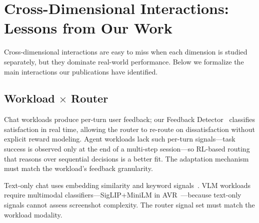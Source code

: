 \section{Cross-Dimensional Interactions: Lessons from Our Work}
\label{sec:cross}

Cross-dimensional interactions are easy to miss when each dimension
is studied separately, but they dominate real-world performance.
Below we formalize the main interactions our publications have
identified.


\subsection{Workload $\times$ Router}
\label{sec:cross:wr}

\begin{observation}
\label{obs:wr-adapt}
Chat workloads produce per-turn user feedback; our Feedback
Detector~\cite{feedbackdet2026} classifies satisfaction in real
time, allowing the router to re-route on dissatisfaction without
explicit reward modeling.  Agent workloads lack such per-turn
signals---task success is observed only at the end of a multi-step
session---so RL-based routing~\cite{routerr1_2025} that reasons
over sequential decisions is a better fit.  The adaptation
mechanism must match the workload's feedback granularity.
\end{observation}

\begin{observation}
\label{obs:wr-modal}
Text-only chat uses embedding similarity and keyword
signals~\cite{vllmsr2026}.  VLM workloads require multimodal
classifiers---SigLIP+MiniLM in AVR~\cite{avr2026}---because
text-only signals cannot assess screenshot complexity.  The router signal set must match the workload modality.
\end{observation}

